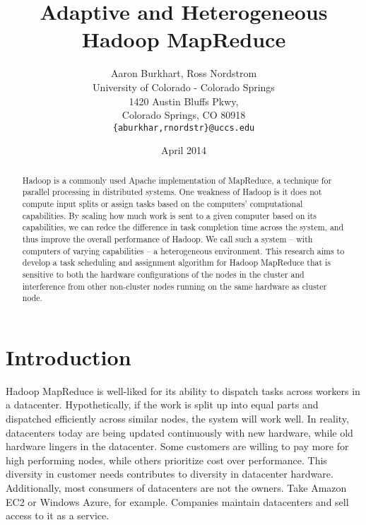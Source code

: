 \documentclass{sig-alternate}
\begin{document}
\title{Adaptive and Heterogeneous Hadoop MapReduce}
\author{Aaron Burkhart, Ross Nordstrom\\
        University of Colorado - Colorado Springs\\
        1420 Austin Bluffs Pkwy,\\
        Colorado Springs, CO 80918\\
        \texttt{\{aburkhar,rnordstr\}@uccs.edu}
       }
\date{April 2014}

\maketitle

\begin{abstract}
Hadoop is a commonly used Apache implementation of MapReduce, a technique for
parallel processing in distributed systems. One weakness of Hadoop is it does
not compute input splits or assign tasks based on the computers' computational capabilities. By scaling
how much work is sent to a given computer based on its capabilities, we can
redce the difference in task completion time across the system, and thus improve
the overall performance of Hadoop. We call such a system – with computers of
varying capabilities – a heterogeneous environment. This research aims to develop
a task scheduling and assignment algorithm for Hadoop MapReduce that is sensitive
to both the hardware configurations of the nodes in the cluster and interference
from other non-cluster nodes running on the same hardware as cluster node.
\end{abstract}


\section{Introduction}
Hadoop MapReduce is well-liked for its ability to dispatch tasks across workers
in a datacenter. Hypothetically, if the work is split up into equal parts and dispatched
efficiently across similar nodes, the system will work well. In reality, datacenters today are being
updated continuously with new hardware, while old hardware lingers in the datacenter. 
Some customers are willing to pay more for high performing nodes, while others prioritize cost over
performance. This diversity in customer needs contributes to diversity in datacenter hardware. 
Additionally, most consumers of datacenters are not the owners. Take Amazon EC2
or Windows Azure, for example. Companies maintain datacenters and sell access to
it as a service.
\end{document}
